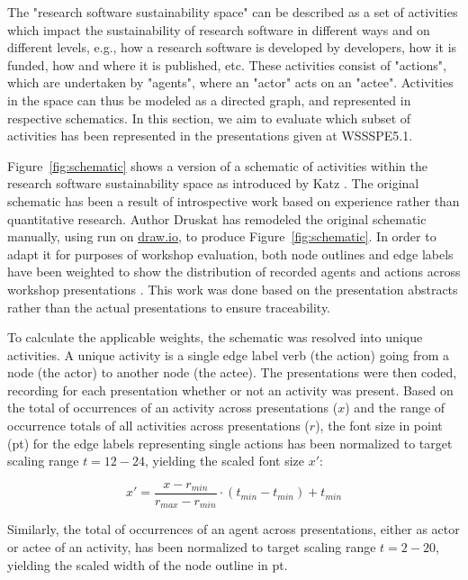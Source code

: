 \documentclass[11pt,letterpaper]{article}
\begin{document}
The "research software sustainability space" can be described as a set of activities which impact the sustainability of research software in different ways and on different levels, e.g., how a research software is developed by developers, how it is funded, how and where it is published, etc.
These activities consist of "actions", which are undertaken by "agents", where an "actor" acts on an "actee".
Activities in the space can thus be modeled as a directed graph, and represented in respective schematics.
In this section, we aim to evaluate which subset of activities has been represented in the presentations given at WSSSPE5.1.

Figure~\ref{fig:schematic} shows a version of a schematic of activities within the research 
software sustainability space 
as introduced by Katz \cite{katz_research_2018}.
The original schematic has been a result of introspective work based on experience rather than quantitative research.
Author Druskat has remodeled the original schematic manually, using \cite{drawio} run on \href{https://www.draw.io}{draw.io}, to produce Figure~\ref{fig:schematic}.
In order to adapt it for purposes of workshop evaluation, both node outlines and edge labels have been weighted to show the distribution of recorded agents and actions across workshop presentations \cite{druskat_activity}. This work was done based on the presentation abstracts \cite{WSSSPE5_1_proceedings_2017} rather than the actual presentations to ensure traceability.

To calculate the applicable weights, the schematic was resolved into unique activities.
A unique activity is a single edge label verb (the action) going from a node (the actor) to another node (the actee).
The presentations were then coded, recording for each presentation whether or not an activity was present.
Based on the total of occurrences of an activity across presentations ($x$) and the range of occurrence totals of all activities across presentations ($r$), the font size in point (pt) for the edge labels representing single actions has been normalized to target scaling range $t = 12-24$, yielding the scaled font size $x'$:

\[x' =  \frac{x - r_{min}}{r_{max} - r_{min}} \cdot \left(t_{min} - t_{min}\right) + t_{min}\]

Similarly, the total of occurrences of an agent across presentations, either as actor or actee of an activity, has been normalized to target scaling range $t = 2-20$, yielding the scaled width of the node outline in pt.
\end{document}
